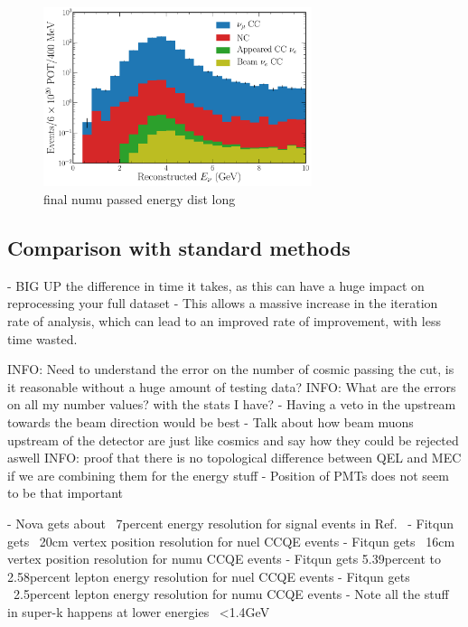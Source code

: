 \begin{figure} %
    \includegraphics[width=0.7\textwidth]{diagrams/6-cvn/chipsnet/final_numu_passed_energy_dist.pdf}
    \caption[final numu passed energy dist short]
    {final numu passed energy dist long}
    \label{fig:final_numu_passed_energy_dist}
\end{figure}

\subsection{Comparison with standard methods} %
\label{sec:cvn_results_comparison} %

- BIG UP the difference in time it takes, as this can have a huge impact on reprocessing your full
dataset
- This allows a massive increase in the iteration rate of analysis, which can lead to an improved
rate of improvement, with less time wasted.

INFO: Need to understand the error on the number of cosmic passing the cut, is it reasonable
without a huge amount of testing data?
INFO: What are the errors on all my number values? with the stats I have?
- Having a veto in the upstream towards the beam direction would be best
- Talk about how beam muons upstream of the detector are just like cosmics and say how they could
be rejected aswell
INFO: proof that there is no topological difference between QEL and MEC if we are combining them
for the energy stuff
- Position of PMTs does not seem to be that important

- Nova gets about ~7percent energy resolution for signal events
in Ref.~\cite{jiang2019}
- Fitqun gets ~20cm vertex position resolution for nuel CCQE events
- Fitqun gets ~16cm vertex position resolution for numu CCQE events
- Fitqun gets 5.39percent to 2.58percent lepton energy resolution for nuel CCQE events
- Fitqun gets ~2.5percent lepton energy resolution for numu CCQE events
- Note all the stuff in super-k happens at lower energies ~<1.4GeV

